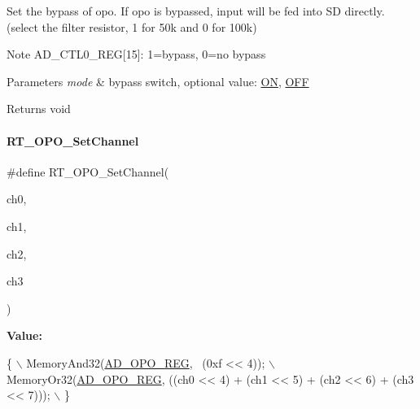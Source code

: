 Set the bypass of opo. If opo is bypassed, input will be fed into SD directly. (select the filter resistor, 1 for 50k and 0 for 100k) 

\begin{DoxyNote}{Note}
A\+D\+\_\+\+C\+T\+L0\+\_\+\+R\+EG\mbox{[}15\mbox{]}\+: 1=bypass, 0=no bypass 
\end{DoxyNote}

\begin{DoxyParams}{Parameters}
{\em mode} & bypass switch, optional value\+: \mbox{\hyperlink{a00020_ad76d1750a6cdeebd506bfcd6752554d2}{ON}}, \mbox{\hyperlink{a00020_a29e413f6725b2ba32d165ffaa35b01e5}{O\+FF}} \\
\hline
\end{DoxyParams}
\begin{DoxyReturn}{Returns}
void 
\end{DoxyReturn}
\mbox{\label{a00002_a5867d7cb8e45d61e08c23747ad488ff8}} 
\paragraph{\texorpdfstring{R\+T\+\_\+\+O\+P\+O\+\_\+\+Set\+Channel}{RT\_OPO\_SetChannel}}
{\footnotesize\ttfamily \#define R\+T\+\_\+\+O\+P\+O\+\_\+\+Set\+Channel(\begin{DoxyParamCaption}\item[{}]{ch0,  }\item[{}]{ch1,  }\item[{}]{ch2,  }\item[{}]{ch3 }\end{DoxyParamCaption})}

{\bfseries Value\+:}
\begin{DoxyCode}
\{                                                                                \(\backslash\)
        MemoryAnd32(\mbox{\hyperlink{a00020_adadaa0ab1ebbd7ba9b70dfd24c3ed44da6dc7e2b1252e5ac208ae78d9c46e8e7e}{AD\_OPO\_REG}}, ~(0xf << 4));                                        \(\backslash\)
        MemoryOr32(\mbox{\hyperlink{a00020_adadaa0ab1ebbd7ba9b70dfd24c3ed44da6dc7e2b1252e5ac208ae78d9c46e8e7e}{AD\_OPO\_REG}}, ((ch0 << 4) + (ch1 << 5) + (ch2 << 6) + (ch3 << 7))); \(\backslash\)
    \}
\end{DoxyCode}


